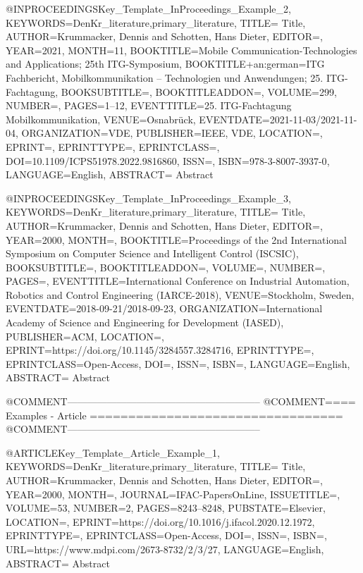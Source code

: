 @INPROCEEDINGS{Key_Template_InProceedings_Example_2,
    KEYWORDS={DenKr_literature,primary_literature},
    TITLE={\begingroup
        Title\endgroup},
    AUTHOR={Krummacker, Dennis and Schotten, Hans Dieter},
    EDITOR={},
    YEAR={2021},
    MONTH={11},
    BOOKTITLE={Mobile Communication-Technologies and Applications; 25th ITG-Symposium},
    BOOKTITLE+an:german={ITG Fachbericht, Mobilkommunikation -- Technologien und Anwendungen; 25. ITG-Fachtagung},
    BOOKSUBTITLE={},
    BOOKTITLEADDON={},
    VOLUME={299},
    NUMBER={},
    PAGES={1--12},
    EVENTTITLE={25. ITG-Fachtagung Mobilkommunikation},
    VENUE={Osnabr{\"u}ck},
    EVENTDATE={2021-11-03/2021-11-04},
    ORGANIZATION={VDE},
    PUBLISHER={IEEE, VDE},
    LOCATION={},
    EPRINT={},
    EPRINTTYPE={},
    EPRINTCLASS={},
    DOI={10.1109/ICPS51978.2022.9816860},
    ISSN={},
    ISBN={978-3-8007-3937-0},
    LANGUAGE={English},
    ABSTRACT={\begingroup
        Abstract\endgroup}
}

@INPROCEEDINGS{Key_Template_InProceedings_Example_3,
    KEYWORDS={DenKr_literature,primary_literature},
    TITLE={\begingroup
        Title\endgroup},
    AUTHOR={Krummacker, Dennis and Schotten, Hans Dieter},
    EDITOR={},
    YEAR={2000},
    MONTH={},
    BOOKTITLE={Proceedings of the 2nd International Symposium on Computer Science and Intelligent Control (ISCSIC)},
    BOOKSUBTITLE={},
    BOOKTITLEADDON={},
    VOLUME={},
    NUMBER={},
    PAGES={},
    EVENTTITLE={International Conference on Industrial Automation, Robotics and Control Engineering (IARCE-2018)},
    VENUE={Stockholm, Sweden},
    EVENTDATE={2018-09-21/2018-09-23},
    ORGANIZATION={International Academy of Science and Engineering for Development (IASED)},
    PUBLISHER={ACM},
    LOCATION={},
    EPRINT={https://doi.org/10.1145/3284557.3284716},
    EPRINTTYPE={},
    EPRINTCLASS={Open-Access},
    DOI={},
    ISSN={},
    ISBN={},
    LANGUAGE={English},
    ABSTRACT={\begingroup
        Abstract\endgroup}
}



@COMMENT{-----------------------------------------------------------}
@COMMENT{====  Examples - Article  =================================}
@COMMENT{-----------------------------------------------------------}

@ARTICLE{Key_Template_Article_Example_1,
    KEYWORDS={DenKr_literature,primary_literature},
    TITLE={\begingroup
        Title\endgroup},
    AUTHOR={Krummacker, Dennis and Schotten, Hans Dieter},
    EDITOR={},
    YEAR={2000},
    MONTH={},
    JOURNAL={IFAC-PapersOnLine},
    ISSUETITLE={},
    VOLUME={53},
    NUMBER={2},
    PAGES={8243--8248},
    PUBSTATE={Elsevier},
    LOCATION={},
    EPRINT={https://doi.org/10.1016/j.ifacol.2020.12.1972},
    EPRINTTYPE={},
    EPRINTCLASS={Open-Access},
    DOI={},
    ISSN={},
    ISBN={},
    URL={https://www.mdpi.com/2673-8732/2/3/27},
    LANGUAGE={English},
    ABSTRACT={\begingroup
        Abstract\endgroup}
}

